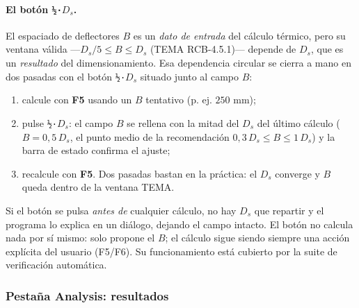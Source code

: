 \documentclass[11pt,a4paper]{article}
\begin{document}
\paragraph{El bot\'on \texttt{½·$D_s$}.}
El espaciado de deflectores $B$ es un \emph{dato de entrada} del c\'alculo
t\'ermico, pero su ventana v\'alida ---$D_s/5 \le B \le D_s$
(TEMA RCB-4.5.1)--- depende de $D_s$, que es un \emph{resultado} del
dimensionamiento. Esa dependencia circular se cierra a mano en dos pasadas con
el bot\'on \texttt{½·$D_s$} situado junto al campo $B$:

\begin{enumerate}[leftmargin=1.6em]
\item calcule con \textbf{F5} usando un $B$ tentativo (p. ej. $250$ mm);
\item pulse \texttt{½·$D_s$}: el campo $B$ se rellena con la
mitad del $D_s$ del \'ultimo c\'alculo ($B = 0{,}5\,D_s$, el punto medio
de la recomendaci\'on $0{,}3\,D_s \le B \le 1\,D_s$) y la barra de
estado confirma el ajuste;
\item recalcule con \textbf{F5}. Dos pasadas bastan en la pr\'actica:
el $D_s$ converge y $B$ queda dentro de la ventana TEMA.
\end{enumerate}

Si el bot\'on se pulsa \emph{antes de} cualquier c\'alculo, no hay
$D_s$ que repartir y el programa lo explica en un di\'alogo, dejando el
campo intacto. El bot\'on no calcula nada por s\'i mismo: solo propone el
$B$; el c\'alculo sigue siendo siempre una acci\'on expl\'icita del
usuario (F5/F6). Su funcionamiento est\'a cubierto por la suite de
verificaci\'on autom\'atica.

\subsubsection{Pesta\~na Analysis: resultados}
\end{document}
